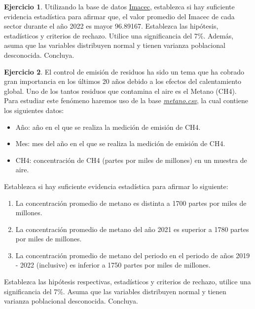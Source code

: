 \documentclass[
  11pt,
]{book}
\providecommand{\tightlist}{%
  \setlength{\itemsep}{0pt}\setlength{\parskip}{0pt}}
\theoremstyle{definition}
\theoremstyle{definition}
\theoremstyle{definition}
\newtheorem{exercise}{Ejercicio}[chapter]
\theoremstyle{definition}
\theoremstyle{remark}
\begin{document}
\begin{exercise}
Utilizando la base de datos \hyperref[Imacec2]{Imacec}, establezca si hay suficiente evidencia estadística para afirmar que, el valor promedio del Imacec de cada sector durante el año 2022 es mayor 96.89167. Establezca las hipótesis, estadísticos y criterios de rechazo. Utilice una significancia del 7\%. Además, asuma que las variables distribuyen normal y tienen varianza poblacional desconocida. Concluya.
\end{exercise}

\begin{exercise}
\protect\hypertarget{exr:metano}{}\label{exr:metano}El control de emisión de residuos ha sido un tema que ha cobrado gran importancia en los últimos 20 años debido a los efectos del calentamiento global. Uno de los tantos residuos que contamina el aire es el Metano (CH4). Para estudiar este fenómeno haremos uso de la base \href{https://raw.githubusercontent.com/Dfranzani/Bases-de-datos-para-cursos/main/2022-2/Estad\%C3\%ADstica\%202/metano.csv}{\emph{metano.csv}}, la cual contiene los siguientes datos:

\begin{itemize}
\tightlist
\item
  Año: año en el que se realiza la medición de emisión de CH4.
\item
  Mes: mes del año en el que se realiza la medición de emisión de CH4.
\item
  CH4: concentración de CH4 (partes por miles de millones) en un muestra de aire.
\end{itemize}

Establezca si hay suficiente evidencia estadística para afirmar lo siguiente:

\begin{enumerate}
\def\labelenumi{\arabic{enumi}.}
\tightlist
\item
  La concentración promedio de metano es distinta a 1700 partes por miles de millones.
\item
  La concentración promedio de metano del año 2021 es superior a 1780 partes por miles de millones.
\item
  La concentración promedio de metano del periodo en el periodo de años 2019 - 2022 (inclusive) es inferior a 1750 partes por miles de millones.
\end{enumerate}

Establezca las hipótesis respectivas, estadísticos y criterios de rechazo, utilice una significancia del 7\%. Asuma que las variables distribuyen normal y tienen varianza poblacional desconocida. Concluya.
\end{exercise}
\end{document}
